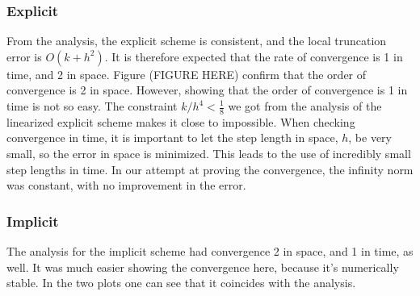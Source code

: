 \subsubsection{Explicit}
From the analysis, the explicit scheme is consistent, and the local truncation error is $O(k + h^2)$. It is therefore expected that the rate of convergence is 1 in time, and 2 in space. Figure (FIGURE HERE) confirm that the order of convergence is 2 in space. However, showing that the order of convergence is 1 in time is not so easy. The constraint $k/h^4 < \frac{1}{8}$ we got from the analysis of the linearized explicit scheme makes it close to impossible. When checking convergence in time, it is important to let the step length in space, $h$, be very small, so the error in space is minimized. This leads to the use of incredibly small step lengths in time. In our attempt at proving the convergence, the infinity norm was constant, with no improvement in the error.


\subsubsection{Implicit}
The analysis for the implicit scheme had convergence 2 in space, and 1 in time, as well. It was much easier showing the convergence here, because it's numerically stable. In the two plots one can see that it coincides with the analysis.

